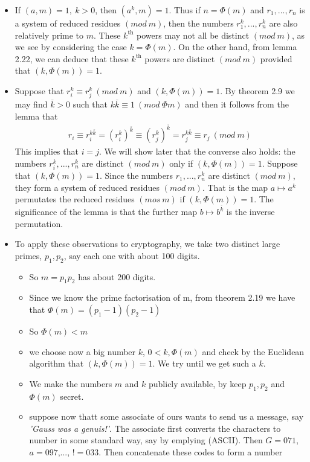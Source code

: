 \documentclass[a4paper]{article}
\begin{document}
\begin{itemize}
    \item If $(a,m)=1,\ k>0$, then $(a^k,m)=1$. Thus if $n=\Phi(m)$ and $r_1,...,r_n$ is a system of reduced residues $(mod\ m)$, then the numbers $r_1^k,...,r_n^k$ are also relatively prime to $m$. These $k^\text{th}$ powers may not all be distinct $(mod\ m)$, as we see by considering the case $k=\Phi(m)$. On the other hand, from lemma 2.22, we can deduce that these $k^\text{th}$ powers are distinct $(mod\ m)$ provided that $(k,\Phi(m))=1$.
    \item Suppose that $r_i^k\equiv r_j^k\ (mod\ m)$ and $(k,\Phi(m))=1$. By theorem 2.9 we may find $\overline{k}>0$ such that $k\overline{k}\equiv 1\ (mod\ \Phi{m})$ and then it follows from the lemma that
    \begin{align}
        r_i\equiv r_i^{k\overline{k}}=(r_i^k)^{\overline{k}}\equiv (r_j^k)^{\overline{k}}= r_j^{k\overline{k}}\equiv r_j\ (mod\ m)
    \end{align}
    This implies that $i=j$. We will show later that the converse also holds: the numbers $r_i^k,...,r_n^k$ are distinct $(mod\ m)$ only if $(k,\Phi(m))=1$. Suppose that $(k,\Phi(m))=1$. Since the numbers $r_1,...,r_n^k$ are distinct $(mod\ m)$, they form a system of reduced residues $(mod\ m)$. That is the map $a\mapsto a^k$ permutates the reduced residues $(mos\ m)$ if $(k,\Phi(m))=1$. The significance of the lemma is that the further map $b\mapsto b^{\overline{k}}$ is the inverse permutation.
    \item To apply these observations to cryptography, we take two distinct large primes, $p_1, p_2$, say each one with about 100 digits.
    \begin{itemize}
        \item So $m=p_1p_2$ has about 200 digits.
        \item Since we know the prime factorisation of m, from theorem 2.19 we have that $\Phi(m)=(p_1-1)(p_2-1)$
        \item So $\Phi(m)<m$
        \item we choose now a big number $k$, $0<k,\Phi(m)$ and check by the Euclidean algorithm that $(k,\Phi(m))=1$. We try until we get such a $k$.
        \item We make the numbers $m$ and $k$ publicly available, by keep $p_1,p_2$ and $\Phi(m)$ secret.
        \item suppose now thatt some associate of ours wants to send us a message, say \textit{'Gauss was a genuis!'}. The associate first converts the characters to number in some standard way, say by emplying (ASCII). Then $G=071$, $a=097$,..., $!=033$. Then concatenate these codes to form a number

\end{itemize}
\end{itemize}
\end{document}
